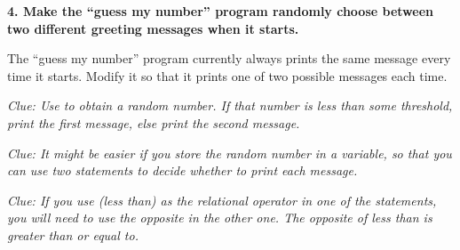 {\bf 4. Make the ``guess my number'' program randomly choose between
  two different greeting messages when it starts.}

The ``guess my number'' program currently always prints the same
message every time it starts.  Modify it so that it prints one of two
possible messages each time.

{\em Clue: Use  to obtain a random number. If that number
  is less than some threshold, print the first message, else print the
  second message.}

{\em Clue: It might be easier if you store the random number in a
  variable, so that you can use two  statements to decide
  whether to print each message.}

{\em Clue: If you use \stw{<} (less than) as the relational operator
  in one of the  statements, you will need to use the opposite
  in the other one.  The opposite of less than is greater than or
  equal to.}
